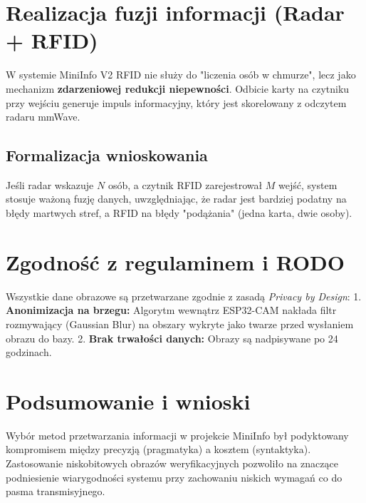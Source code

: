 \documentclass[12pt,a4paper]{article}
\begin{document}
\section{Realizacja fuzji informacji (Radar + RFID)}
W systemie MiniInfo V2 RFID nie służy do "liczenia osób w chmurze", lecz jako mechanizm \textbf{zdarzeniowej redukcji niepewności}. Odbicie karty na czytniku przy wejściu generuje impuls informacyjny, który jest skorelowany z odczytem radaru mmWave. 

\subsection{Formalizacja wnioskowania}
Jeśli radar wskazuje $N$ osób, a czytnik RFID zarejestrował $M$ wejść, system stosuje ważoną fuzję danych, uwzględniając, że radar jest bardziej podatny na błędy martwych stref, a RFID na błędy "podążania" (jedna karta, dwie osoby).

\section{Zgodność z regulaminem i RODO}
Wszystkie dane obrazowe są przetwarzane zgodnie z zasadą \textit{Privacy by Design}:
1. \textbf{Anonimizacja na brzegu:} Algorytm wewnątrz ESP32-CAM nakłada filtr rozmywający (Gaussian Blur) na obszary wykryte jako twarze przed wysłaniem obrazu do bazy.
2. \textbf{Brak trwałości danych:} Obrazy są nadpisywane po 24 godzinach.

\section{Podsumowanie i wnioski}
Wybór metod przetwarzania informacji w projekcie MiniInfo był podyktowany kompromisem między precyzją (pragmatyka) a kosztem (syntaktyka). Zastosowanie niskobitowych obrazów weryfikacyjnych pozwoliło na znaczące podniesienie wiarygodności systemu przy zachowaniu niskich wymagań co do pasma transmisyjnego.
\end{document}

